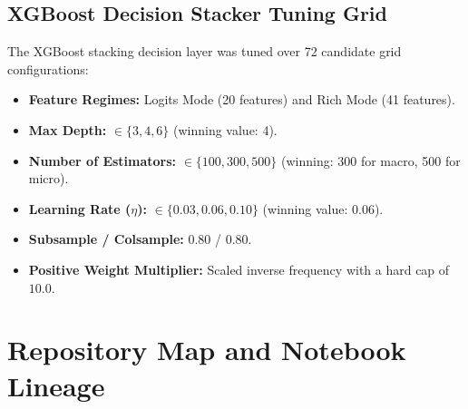 \section*{XGBoost Decision Stacker Tuning Grid}
The XGBoost stacking decision layer was tuned over 72 candidate grid configurations:
\begin{itemize}
  \item \textbf{Feature Regimes:} Logits Mode (20 features) and Rich Mode (41 features).
  \item \textbf{Max Depth:} $\in \{3, 4, 6\}$ (winning value: 4).
  \item \textbf{Number of Estimators:} $\in \{100, 300, 500\}$ (winning: 300 for macro, 500 for micro).
  \item \textbf{Learning Rate ($\eta$):} $\in \{0.03, 0.06, 0.10\}$ (winning value: 0.06).
  \item \textbf{Subsample / Colsample:} $0.80$ / $0.80$.
  \item \textbf{Positive Weight Multiplier:} Scaled inverse frequency with a hard cap of $10.0$.
\end{itemize}

\clearpage
\chapter{Repository Map and Notebook Lineage}
\label{app:repository-map}

